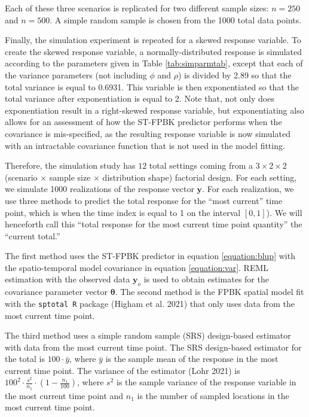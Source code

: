 \documentclass[]{article}    %
\begin{document}
Each of these three scenarios is replicated for two different sample
sizes: \(n = 250\) and \(n = 500\). A simple random sample is chosen
from the 1000 total data points.

Finally, the simulation experiment is repeated for a skewed response
variable. To create the skewed response variable, a normally-distributed
response is simulated according to the parameters given in Table
\ref{tab:simparmtab}, except that each of the variance parameters (not
including \(\phi\) and \(\rho\)) is divided by 2.89 so that the total
variance is equal to 0.6931. This variable is then exponentiated so that
the total variance after exponentiation is equal to 2. Note that, not
only does exponentiation result in a right-skewed response variable, but
exponentiating also allows for an assessment of how the ST-FPBK
predictor performs when the covariance is mis-specified, as the
resulting response variable is now simulated with an intractable
covariance function that is not used in the model fitting.

Therefore, the simulation study has \(12\) total settings coming from a
\(3 \times 2 \times 2\) (scenario \(\times\) sample size \(\times\)
distribution shape) factorial design. For each setting, we simulate 1000
realizations of the response vector \(\mathbf{y}\). For each
realization, we use three methods to predict the total response for the
``most current'' time point, which is when the time index is equal to 1
on the interval \([0, 1]\)). We will henceforth call this ``total
response for the most current time point quantity'' the ``current
total.''

The first method uses the ST-FPBK predictor in equation
\ref{equation:blup} with the spatio-temporal model covariance in
equation \ref{equation:var}. REML estimation with the observed data
\(\mathbf{y}_o\) is used to obtain estimates for the covariance
parameter vector \(\bm{\theta}\). The second method is the FPBK spatial
model fit with the \texttt{sptotal R} package (Higham et al. 2021) that
only uses data from the most current time point.

The third method uses a simple random sample (SRS) design-based
estimator with data from the most current time point. The SRS
design-based estimator for the total is \(100 \cdot \bar{y}\), where
\(\bar{y}\) is the sample mean of the response in the most current time
point. The variance of the estimator (Lohr 2021) is
\(100^2 \cdot \frac{s^2}{n_1} \cdot (1 - \frac{n_1}{100})\), where
\(s^2\) is the sample variance of the response variable in the most
current time point and \(n_1\) is the number of sampled locations in the
most current time point.
\end{document}
